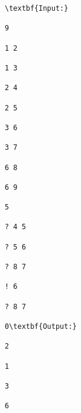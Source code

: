 \begin{verbatim}
\textbf{Input:}

9

1 2

1 3

2 4

2 5

3 6

3 7

6 8

6 9

5

? 4 5

? 5 6

? 8 7

! 6

? 8 7

0\textbf{Output:}

2

1

3

6\end{verbatim}